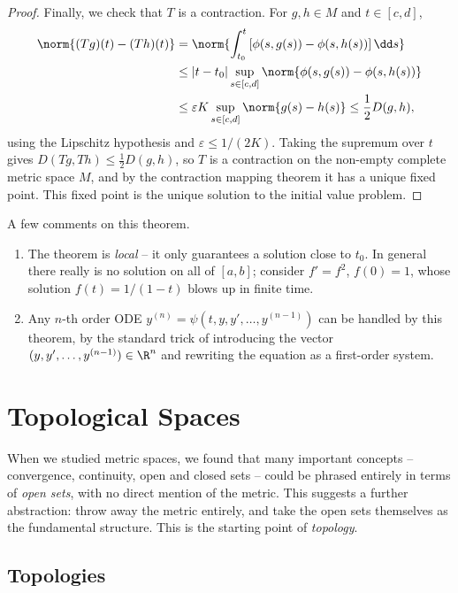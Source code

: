 \begin{proof}
    Finally, we check that $T$ is a contraction. For $g, h \in M$ and $t \in [c, d]$,
    \begin{align*}
    \norm{(Tg)(t) - (Th)(t)} &= \norm{\int_{t_0}^t \left[\phi(s, g(s)) - \phi(s, h(s))\right] \dd s} \\
    &\leq |t - t_0| \sup_{s \in [c, d]} \norm{\phi(s, g(s)) - \phi(s, h(s))} \\
    &\leq \varepsilon K \sup_{s \in [c, d]} \norm{g(s) - h(s)} \leq \frac{1}{2} D(g, h),
    \end{align*}
    using the Lipschitz hypothesis and $\varepsilon \leq 1/(2K)$. Taking the supremum over $t$ gives $D(Tg, Th) \leq \frac{1}{2}D(g, h)$, so $T$ is a contraction on the non-empty complete metric space $M$, and by the contraction mapping theorem it has a unique fixed point. This fixed point is the unique solution to the initial value problem.
\end{proof}

\begin{remark}
    A few comments on this theorem.
    \begin{enumerate}[label=(\roman*)]
        \item The theorem is \emph{local} -- it only guarantees a solution close to $t_0$. In general there really is no solution on all of $[a, b]$; consider $f' = f^2$, $f(0) = 1$, whose solution $f(t) = 1/(1 - t)$ blows up in finite time.
        \item Any $n$-th order ODE $y^{(n)} = \psi(t, y, y', \dots, y^{(n-1)})$ can be handled by this theorem, by the standard trick of introducing the vector $(y, y', \dots, y^{(n - 1)}) \in \R^n$ and rewriting the equation as a first-order system.
    \end{enumerate}
\end{remark}

\section{Topological Spaces}

When we studied metric spaces, we found that many important concepts -- convergence, continuity, open and closed sets -- could be phrased entirely in terms of \emph{open sets}, with no direct mention of the metric. This suggests a further abstraction: throw away the metric entirely, and take the open sets themselves as the fundamental structure. This is the starting point of \emph{topology}.

\subsection{Topologies}

